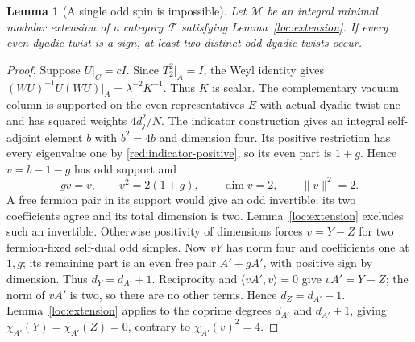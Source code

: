 \documentclass[11pt,a4paper]{article}
\numberwithin{equation}{section}
\newtheorem{lemma}[theorem]{Lemma}
\begin{document}
\begin{lemma}[A single odd spin is impossible]
\label{red:ef:one-odd-spin}
Let $\mathcal M$ be an integral minimal modular extension of a category
$\mathcal F$ satisfying Lemma~\ref{loc:extension}. If every even dyadic
twist is a sign, at least two distinct odd dyadic twists occur.
\end{lemma}
\begin{proof}
Suppose $U|_C=cI$. Since $T_2^2|_A=I$, the Weyl
identity gives $(WU)^{-1}U(WU)|_A=\lambda^{-2}K^{-1}$.
Thus $K$ is scalar.
The complementary vacuum column is supported on the even
representatives $E$ with actual dyadic twist one and has
squared weights $4d_j^2/N$. The indicator construction gives an
integral self-adjoint element $b$ with $b^2=4b$ and dimension four.
Its positive restriction has every eigenvalue one by
\eqref{red:indicator-positive}, so its even part is $1+g$.
Hence $v=b-1-g$ has odd support and
\[
             gv=v,\qquad v^2=2(1+g),\qquad \dim v=2,
             \qquad \|v\|^2=2.
\]
A free fermion pair in its support would give an odd invertible:
its two coefficients agree and its total dimension is two. Lemma~\ref{loc:extension}
excludes such an invertible.
Otherwise positivity of dimensions forces $v=Y-Z$ for two
fermion-fixed self-dual odd simples. Now $vY$ has norm four
and coefficients one at $1,g$; its remaining part is an even
free pair $A'+gA'$, with positive sign by dimension. Thus
$d_Y=d_{A'}+1$. Reciprocity and $\langle vA',v\rangle=0$
give $vA'=Y+Z$; the norm of $vA'$ is two, so there are no
other terms. Hence $d_Z=d_{A'}-1$. Lemma~\ref{loc:extension} applies to the coprime
degrees $d_{A'}$ and $d_{A'}\pm1$, giving
$\chi_{A'}(Y)=\chi_{A'}(Z)=0$, contrary to
$\chi_{A'}(v)^2=4$.
\end{proof}
\end{document}
